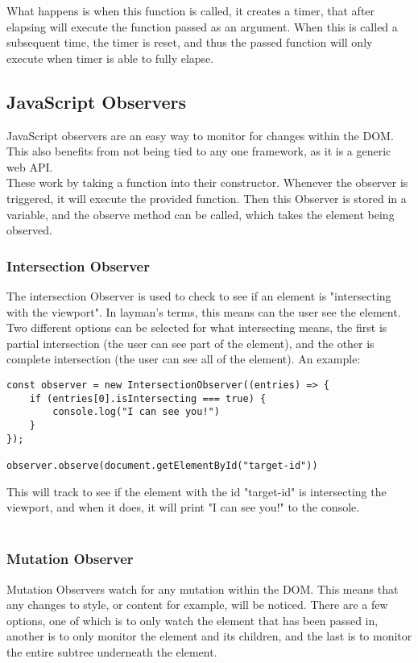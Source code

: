 \documentclass[portfolio.tex]{subfiles}
\begin{document}
				What happens is when this function is called, it creates a timer, that after elapsing will execute the function passed as an argument. When this is called a subsequent time, the timer is reset, and thus the passed function will only execute when timer is able to fully elapse.

		\subsection{JavaScript Observers}
			JavaScript observers are an easy way to monitor for changes within the DOM. This also benefits from not being tied to any one framework, as it is a generic web API.\\

			These work by taking a function into their constructor. Whenever the observer is triggered, it will execute the provided function. Then this Observer is stored in a variable, and the observe method can be called, which takes the element being observed. \\


			\subsubsection{Intersection Observer}
				The intersection Observer is used to check to see if an element is "intersecting with the viewport". In layman's terms, this means can the user see the element. Two different options can be selected for what intersecting means, the first is partial intersection (the user can see part of the element), and the other is complete intersection (the user can see all of the element). An example: \\

				\begin{lstlisting}
const observer = new IntersectionObserver((entries) => {
	if (entries[0].isIntersecting === true) {
		console.log("I can see you!")
	}
});

observer.observe(document.getElementById("target-id"))
				\end{lstlisting}

				This will track to see if the element with the id "target-id" is intersecting the viewport, and when it does, it will print "I can see you!" to the console.\\

				\autocite{intersection-observer}\\

			\subsubsection{Mutation Observer}
				Mutation Observers watch for any mutation within the DOM. This means that any changes to style, or content for example, will be noticed. There are a few options, one of which is to only watch the element that has been passed in, another is to only monitor the element and its children, and the last is to monitor the entire subtree underneath the element. \\
\end{document}
